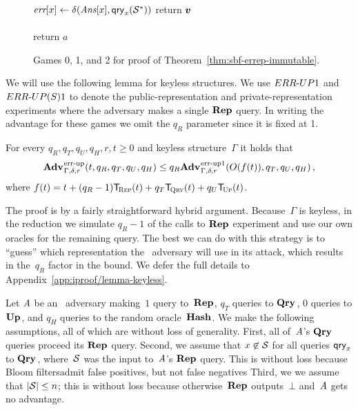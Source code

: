 \begin{figure*}
{{    \tab\tab $\textit{err}[x] \gets \delta(\textit{Ans}[x],\mathsf{qry}_x(\mathcal{S}^*))$
    }
    return $\boldsymbol{v}$
}
{
  \vspace{-7pt}
  \
      \hfill {} \\[2pt]
    \\[2pt]
    return $a$
}
\caption{Games 0, 1, and 2 for proof of Theorem~\ref{thm:sbf-errep-immutable}.}
\label{fig:sbf-errep-immutable/games}
\end{figure*}

We will use the following lemma for keyless structures. We use ${ERR\mbox{-}UP}1$ and
${ERR\mbox{-}UP(S)}1$ to denote the public-representation and private-representation
experiments where the adversary makes a single $\textup{\textbf{Rep}}\hspace{0.5pt}$ query. In writing the
advantage for these games we omit the $q_R$ parameter since it is fixed at 1.
%

\begin{lemma}\label{thm:lemma1}
  For every $q_R, q_T, q_U, q_H, r, t \geq 0$ and keyless structure~$\Gamma$ it
  holds that
  \begin{equation*}
    \Adv{\errep}_{\Gamma,\delta,r}(t, q_R, q_T, q_U, q_H) \leq
    q_R\Adv{\errep1}_{\Gamma,\delta,r}(O(f(t)), q_T, q_U, q_H) \,,
  \end{equation*}
  where $f(t) = t + (q_R-1)\ticks(\Rep,t) + q_T\ticks(\Qry,t) + q_U\ticks(\Up,t)$.
\end{lemma}
%
%
\noindent
The proof is by a fairly straightforward hybrid argument. Because~$\Gamma$ is
keyless, in the reduction we simulate $q_R-1$ of the calls to $\textup{\textbf{Rep}}\hspace{0.5pt}$ experiment
and use our own oracles for the remaining query. The best we can do with this
strategy is to ``guess'' which representation the \errep\ adversary will use in
its attack, which results in the~$q_R$ factor in the bound.
%
We defer the full details to Appendix~\ref{app:iproof/lemma-keyless}.

Let $\mathit{A}$ be an \errep\ adversary making~$1$ query to~$\textup{\textbf{Rep}}\hspace{0.5pt}$, $q_T$ queries
to $\textup{\textbf{Qry}}\hspace{0.5pt}$, $0$ queries to $\textup{\textbf{Up}}\hspace{0.5pt}$, and $q_H$ queries to the random
oracle~$\textup{\textbf{Hash}}\hspace{0.5pt}$.
%
We make the following assumptions, all of which are without loss of generality.
%
First, all of~$\mathit{A}$'s $\textup{\textbf{Qry}}\hspace{0.5pt}$ queries proceed its $\textup{\textbf{Rep}}\hspace{0.5pt}$ query.
%
Second, we assume that $x\not\in\mathcal{S}$ for all queries $\mathsf{qry}_x$ to $\textup{\textbf{Qry}}\hspace{0.5pt}$,
where~$\mathcal{S}$ was the input to~$\mathit{A}$'s $\textup{\textbf{Rep}}\hspace{0.5pt}$ query. This is without loss
because Bloom filtersadmit false positives, but not false negatives
%
Third, we we assume that $|\mathcal{S}| \leq n$; this is without loss because
otherwise~$\textup{\textbf{Rep}}\hspace{0.5pt}$ outputs~$\bot$ and~$\mathit{A}$ gets no advantage.

